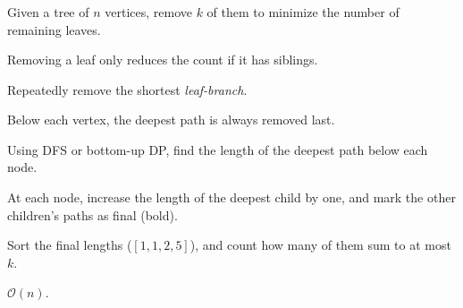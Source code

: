 \begin{frame}
  \frametitle{\problemtitle}

  \begin{columns}
    \begin{description}
      \item<+->[Problem:] Given a tree of $n$ vertices, remove $k$ of them to
        minimize the number of remaining leaves.
      \item<+->[Insight:] Removing a leaf only reduces the count if it has siblings.
      \item<+->[Greedy:] Repeatedly remove the shortest \emph{leaf-branch}.
      \item<+->[Insight:] Below each vertex, the deepest path is always
        removed last.
      \item<+->[Solution:] Using DFS or bottom-up DP, find the length of the
        deepest path below each node.
      \item<+->[] At each node, increase the length of the deepest child by one,
        and mark the other children's paths as final (bold).
      \item<+->[] Sort the final lengths ($[1,1,2,5]$), and count how many of them sum
        to at most $k$.
      \item<+->[Run time:] $\mathcal O(n)$.
    \end{description}



\end{columns}
\end{frame}
